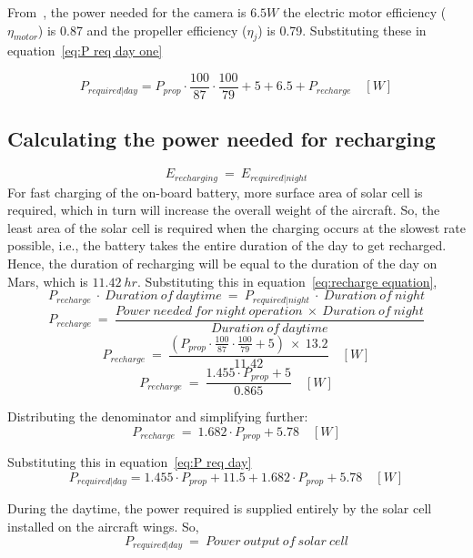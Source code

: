 \p From~\cite{Manual}, the power needed for the camera is $6.5 W$ the electric motor efficiency ($\eta_{motor}$) is 0.87 and the propeller efficiency ($\eta_j$) is 0.79. Substituting these in equation~\ref{eq:P req day one}

\[ P_{required|day} = P_{prop} \cdot \frac{100}{87} \cdot \frac{100}{79} + 5 + 6.5 + P_{recharge} \quad [W] \]

\subsection{Calculating the power needed for recharging}

\vspace{0.2cm}

\[ E_{recharging} \ = \ E_{required|night} \]
\p For fast charging of the on-board battery, more surface area of solar cell is required, which in turn will increase the overall weight of the aircraft. So, the least area of the solar cell is required when the charging occurs at the slowest rate possible, i.e., the battery takes the entire duration of the day to get recharged. Hence, the duration of recharging will be equal to the duration of the day on Mars, which is $ 11.42 \ hr $. Substituting this in equation~\ref{eq:recharge equation},
\[ P_{recharge} \ \cdot \ Duration \ of \ daytime \ = \ P_{required | night} \ \cdot \ Duration \ of \ night \]
\[ P_{recharge} \ = \ \frac{ Power \ needed \ for \ night \ operation \ \times \ Duration \ of \ night }{ Duration \ of \ daytime } \]
\[ P_{recharge} \ = \ \frac{ \left(P_{prop} \cdot \frac{100}{87} \cdot \frac{100}{79} + 5 \right) \ \times \ 13.2 }{ 11.42 } \quad [W] \]
\[ P_{recharge} \ = \ \frac{ 1.455 \cdot P_{prop} + 5 }{ 0.865 } \quad [W] \]

\p Distributing the denominator and simplifying further:
\[ P_{recharge} \ = \ 1.682 \cdot P_{prop} + 5.78 \quad [W] \]

\p Substituting this in equation~\ref{eq:P req day}
\[ P_{required|day} = 1.455 \cdot P_{prop} + 11.5 + 1.682 \cdot P_{prop} + 5.78 \quad [W] \]

\p During the daytime, the power required is supplied entirely by the solar cell installed on the aircraft wings. So,
\[ P_{required|day} \ = \ Power \ output \ of \ solar \ cell \]

